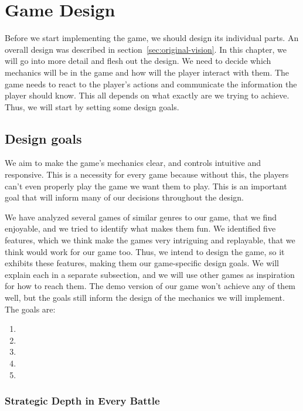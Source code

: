 \chapter{Game Design}

Before we start implementing the game, we should design its individual parts.
An overall design was described in section~\ref{sec:original-vision}.
In this chapter, we will go into more detail and flesh out the design.
We need to decide which mechanics will be in the game and how will the player interact with them.
The game needs to react to the player's actions and communicate the information the player should know.
This all depends on what exactly are we trying to achieve.
Thus, we will start by setting some design goals.

\section{Design goals}

We aim to make the game's mechanics clear, and controls intuitive and responsive.
This is a necessity for every game because without this, the players can't even properly play the game we want them to play.
This is an important goal that will inform many of our decisions throughout the design.

We have analyzed several games of similar genres to our game, that we find enjoyable, and we tried to identify what makes them fun.
We identified five features, which we think make the games very intriguing and replayable, that we think would work for our game too.
Thus, we intend to design the game, so it exhibits these features, making them our game-specific design goals.
We will explain each in a separate subsection, and we will use other games as inspiration for how to reach them.
The demo version of our game won't achieve any of them well, but the goals still inform the design of the mechanics we will implement.
The goals are:
\begin{enumerate}
    \item {}
    \item {}
    \item {}
    \item {}
    \item {}
\end{enumerate}

\subsection{Strategic Depth in Every Battle} \label{sec:goal-depth-battle}

